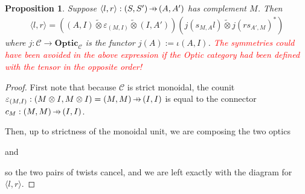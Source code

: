 \documentclass[11pt,a4paper]{article}
\theoremstyle{plain}
\newtheorem{proposition}[theorem]{Proposition}
\theoremstyle{definition}
\newcommand{\C}{\mathscr{C}}
\newcommand{\Optic}{\mathbf{Optic}}
\newcommand{\switched}{\mathbin{\tilde{\otimes}}}
\newcommand{\hto}{\ensuremath{\,\mathaccent\shortmid\rightarrow\,}}
\newcommand{\todo}[1]{\textcolor{red}{\small #1}}
\begin{document}

\begin{proposition}\label{prop-optic-decompose}
  Suppose $\langle l, r \rangle : (S, S') \hto (A, A')$ has complement $M$. Then
  \begin{align*}
    \langle l, r \rangle = ((A, I) \switched \varepsilon_{(M, I)} \switched (I, A'))(j(s_{M,A}l) \switched j(rs_{A',M})^*)
  \end{align*}
  where $j : \C \to \Optic_\C$ is the functor $j(A) := \iota(A, I)$.
  \todo{The symmetries could have been avoided in the above expression if the Optic category had been defined with the tensor in the opposite order!}
\end{proposition}
\begin{proof}
  First note that because $\C$ is strict monoidal, the counit $\varepsilon_{(M, I)} : (M \otimes I, M \otimes I) = (M, M) \hto (I, I)$ is equal to the connector $c_M : (M, M) \hto (I, I)$.

  Then, up to strictness of the monoidal unit, we are composing the two optics
  \begin{center}
    
  \end{center}
  and
  \begin{center}
    
  \end{center}
  so the two pairs of twists cancel, and we are left exactly with the diagram for $\langle l, r \rangle$.
\end{proof}
\end{document}
